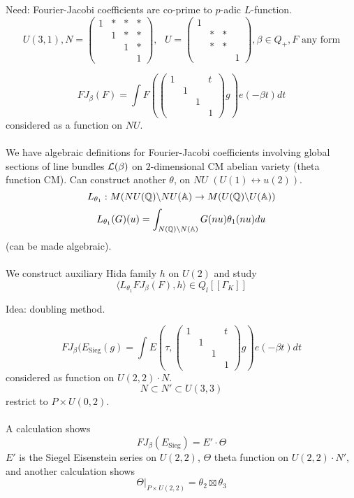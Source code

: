 \documentclass[12pt,amsfont]{amsart}
\begin{document}
Need: Fourier-Jacobi coefficients are co-prime to $p$-adic $L$-function. 
\[U(3,1), N = \begin{pmatrix} 1 & \ast & \ast & \ast \\ & 1 & \ast & \ast \\ & & 1 & \ast \\ & & & 1 \end{pmatrix}, \text{ } U = \begin{pmatrix} 1 & & & \\ & \ast & \ast & \\ & \ast & \ast & \\ & & & 1 \end{pmatrix}, \beta \in Q_+, F \text{ any form}\]

\[F J_\beta(F) = \int F\left( \begin{pmatrix} 1 & & & t \\ & 1 & & \\ & & 1 & \\ & & & 1 \end{pmatrix} g \right) e(-\beta t) dt \]
considered as a function on $NU$. \\ \\
We have algebraic definitions for Fourier-Jacobi coefficients involving global sections of line bundles $\mathcal{L}(\beta)$ on $2$-dimensional CM abelian variety (theta function CM). Can construct another $\theta$, on $NU$ $(U(1) \leftrightarrow u(2))$. 
\[L_{\theta_1} : M(NU({\mathbb Q}) \backslash NU(\mathbb{A}) \rightarrow M(U({\mathbb Q}) \backslash U(\mathbb{A})) \]
\[L_{\theta_1}(G)(u) = \int_{N({\mathbb Q}) \backslash N(\mathbb{A})} G(nu) \theta_1(nu) du \]
(can be made algebraic). \\ \\
We construct auxiliary Hida family $h$ on $U(2)$ and study
\[\langle L_{\theta_1} FJ_\beta(F), h \rangle \in Q_l[[\Gamma_K ]]\]

Idea: doubling method. 

\[FJ_\beta(E_{\text{Sieg}}(g) = \int E\left(\tau, \begin{pmatrix} 1 & & & t \\ & 1 & & \\ & & 1 & \\ & & & 1 \end{pmatrix} g \right)e(-\beta t) dt \]
considered as function on $U(2,2) \cdot N$. 
\[N \subset N' \subset U(3,3) \]
restrict to $P \times U(0,2)$. \\ \\
A calculation shows
\[FJ_\beta(E_{\text{Sieg}}) = E' \cdot \Theta\]
$E'$ is the Siegel Eisenstein series on $U(2,2)$, $\Theta$ theta function on $U(2,2) \cdot N'$, and another calculation shows
\[\Theta |_{P \times U(2,2)} = \theta_2 \boxtimes \theta_3\]
\end{document}
